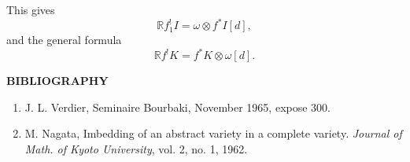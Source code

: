 \documentclass[12pt]{amsart}
\theoremstyle{plain}
\theoremstyle{definition}
\newcommand{\bR}{\mathbb{R}}
\begin{document}
This gives
\[
\bR f^!_1I=\omega\otimes f^*I[d],
\]
and the general formula
\[
\bR f^!K=f^*K\otimes\omega[d].
\]

\bigskip

\begin{center}
\textbf{BIBLIOGRAPHY}
\end{center}

\begin{enumerate}
\item[{[1]}] J. L. Verdier, Seminaire Bourbaki, November 1965, expose 300.
\item[{[2]}] M. Nagata, Imbedding of an abstract variety in a complete variety. \textit{Journal of Math. of Kyoto University}, vol. 2, no. 1, 1962.
\end{enumerate}
\end{document}
